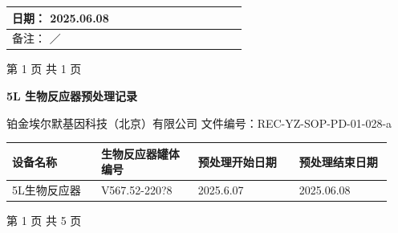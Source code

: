 \documentclass[UTF8,10pt,a4paper,fontset=fandol]{ctexart}
\newcommand{\fieldvalue}[1]{#1}
\newcommand{\handwritten}[1]{#1}
\begin{document}
\begin{center}
\begin{tabular}{|p{0.46\linewidth}|p{0.46\linewidth}|}
\begin{minipage}[t]{0.44\linewidth}
日期：%
\fieldvalue{\handwritten{2025.06.08}}
\end{minipage}
\\
\hline

备注：%
\fieldvalue{\handwritten{／}}
\\
\hline
\end{tabular}
\end{center}

\begin{center}
第 1 页 共 1 页
\end{center}

\newpage

\begin{center}
\textbf{\Large 5L 生物反应器预处理记录}
\end{center}

\vspace{1em}

\noindent
铂金埃尔默基因科技（北京）有限公司 \hfill
文件编号：REC-YZ-SOP-PD-01-028-a

\vspace{0.5em}

\begin{center}
\begin{tabular}{|p{0.22\linewidth}|p{0.24\linewidth}|p{0.25\linewidth}|p{0.23\linewidth}|}
\hline
设备名称 & 生物反应器罐体编号 & 预处理开始日期 & 预处理结束日期 \\
\hline
\fieldvalue{5L生物反应器}
&
\fieldvalue{\handwritten{V567.52-220?8}}
&
\fieldvalue{\handwritten{2025.6.07}}
&
\fieldvalue{\handwritten{2025.06.08}}
\\
\hline
\end{tabular}
\end{center}

\vfill

\begin{center}
第 1 页 共 5 页
\end{center}
\end{document}
